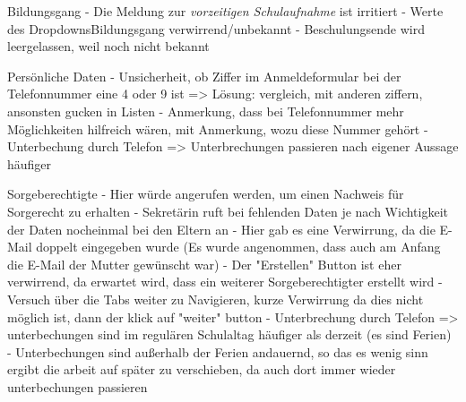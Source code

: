 Bildungsgang
- Die Meldung zur \textit{vorzeitigen Schulaufnahme} ist irritiert
- Werte des DropdownsBildungsgang verwirrend/unbekannt
- Beschulungsende wird leergelassen, weil noch nicht bekannt
 	























































Persönliche Daten	
- Unsicherheit, ob Ziffer im Anmeldeformular bei der Telefonnummer eine 4 oder 9 ist => Lösung: vergleich, mit anderen ziffern, ansonsten gucken in Listen
- Anmerkung, dass bei Telefonnummer mehr Möglichkeiten hilfreich wären, mit Anmerkung, wozu diese Nummer gehört	
- Unterbechung durch Telefon => Unterbrechungen passieren nach eigener Aussage häufiger















Sorgeberechtigte	
- Hier würde angerufen werden, um einen Nachweis für Sorgerecht zu erhalten
 - Sekretärin ruft bei fehlenden Daten je nach Wichtigkeit der Daten nocheinmal bei den Eltern an
- Hier gab es eine Verwirrung, da die E-Mail doppelt eingegeben wurde (Es wurde angenommen, dass auch am Anfang die E-Mail der Mutter gewünscht war)
- Der "Erstellen" Button ist eher verwirrend, da erwartet wird, dass ein weiterer Sorgeberechtigter erstellt wird
- Versuch über die Tabs weiter zu Navigieren, kurze Verwirrung da dies nicht möglich ist, dann der klick auf "weiter" button
 - Unterbrechung durch Telefon => unterbechungen sind im regulären Schulaltag häufiger als derzeit (es sind Ferien) 
 - Unterbechungen sind außerhalb der Ferien andauernd, so das es wenig sinn ergibt die arbeit auf später zu verschieben, da auch dort immer wieder unterbechungen passieren




















